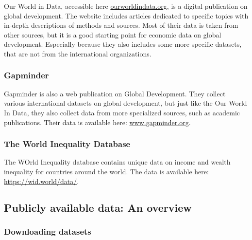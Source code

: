 \documentclass[
]{book}
\begin{document}
Our World in Data, accessible here \href{http://www.ourworldindata.org}{ourworldindata.org}, is a digital publication on global development. The website includes articles dedicated to specific topics with in-depth descriptions of methods and sources. Most of their data is taken from other sources, but it is a good starting point for economic data on global development. Especially because they also includes some more specific datasets, that are not from the international organizations.

\hypertarget{gapminder}{%
\subsubsection*{Gapminder}\label{gapminder}}

Gapminder is also a web publication on Global Development. They collect various international datasets on global development, but just like the Our World In Data, they also collect data from more specialized sources, such as academic publications. Their data is available here:
\href{https://www.gapminder.org/data/}{www.gapminder.org}.

\hypertarget{the-world-inequality-database}{%
\subsubsection*{The World Inequality Database}\label{the-world-inequality-database}}

The WOrld Inequality database contains unique data on income and wealth inequality for countries around the world. The data is available here: \href{https://wid.world/data}{https://wid.world/data/}.

\hypertarget{publicly-available-data-an-overview}{%
\subsection*{Publicly available data: An overview}\label{publicly-available-data-an-overview}}

\hypertarget{downloading-datasets}{%
\subsubsection*{Downloading datasets}\label{downloading-datasets}}
\end{document}
